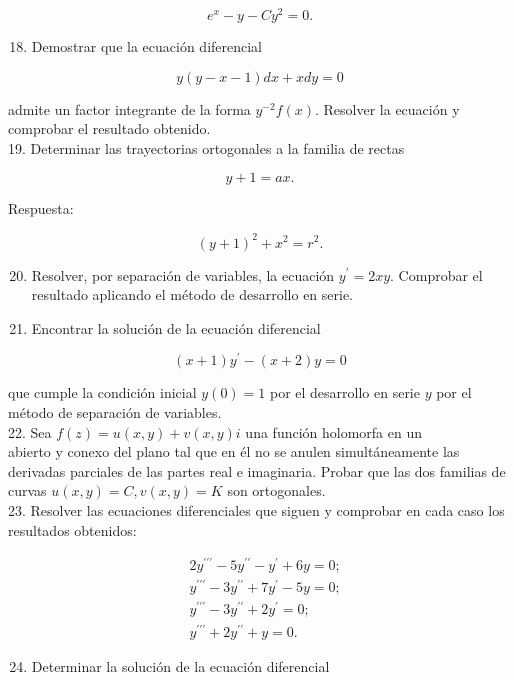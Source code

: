 \documentclass[10pt]{article}
\theoremstyle{plain}
\theoremstyle{definition}
\theoremstyle{remark}
\begin{document}
$$
e^{x}-y-C y^{2}=0 .
$$

\begin{enumerate}
  \setcounter{enumi}{17}
  \item Demostrar que la ecuación diferencial
\end{enumerate}

$$
y(y-x-1) d x+x d y=0
$$

admite un factor integrante de la forma $y^{-2} f(x)$. Resolver la ecuación y comprobar el resultado obtenido.\\
19. Determinar las trayectorias ortogonales a la familia de rectas

$$
y+1=a x .
$$

Respuesta:

$$
(y+1)^{2}+x^{2}=r^{2} .
$$

\begin{enumerate}
  \setcounter{enumi}{19}
  \item Resolver, por separación de variables, la ecuación $y^{\prime}=2 x y$. Comprobar el resultado aplicando el método de desarrollo en serie.
  \item Encontrar la solución de la ecuación diferencial
\end{enumerate}

$$
(x+1) y^{\prime}-(x+2) y=0
$$

que cumple la condición inicial $y(0)=1$ por el desarrollo en serie $y$ por el método de separación de variables.\\
22. Sea $f(z)=u(x, y)+v(x, y) i$ una función holomorfa en un\\
abierto y conexo del plano tal que en él no se anulen simultáneamente las derivadas parciales de las partes real e imaginaria. Probar que las dos familias de curvas $u(x, y)=C, v(x, y)=K$ son ortogonales.\\
23. Resolver las ecuaciones diferenciales que siguen y comprobar en cada caso los resultados obtenidos:

$$
\begin{aligned}
& 2 y^{\prime \prime \prime}-5 y^{\prime \prime}-y^{\prime}+6 y=0 ; \\
& y^{\prime \prime \prime}-3 y^{\prime \prime}+7 y^{\prime}-5 y=0 ; \\
& y^{\prime \prime \prime}-3 y^{\prime \prime}+2 y^{\prime}=0 ; \\
& y^{\prime \prime \prime}+2 y^{\prime \prime}+y=0 .
\end{aligned}
$$

\begin{enumerate}
  \setcounter{enumi}{23}
  \item Determinar la solución de la ecuación diferencial
\end{enumerate}
\end{document}
